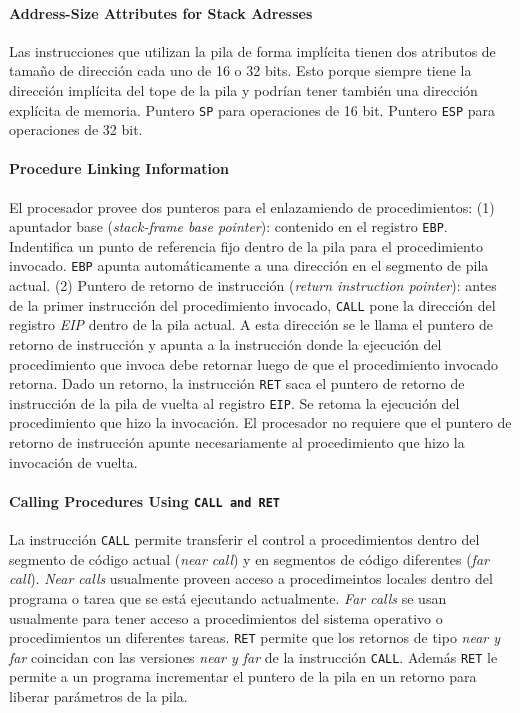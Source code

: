 \paragraph{Address-Size Attributes for Stack Adresses}
Las instrucciones que utilizan la pila de forma implícita tienen dos atributos de tamaño de dirección cada uno de 16 o 32 bits. Esto porque siempre tiene la dirección implícita del tope de la pila y podrían tener también una dirección explícita de memoria. Puntero \texttt{SP} para operaciones de 16 bit. Puntero \texttt{ESP} para operaciones de 32 bit. 

\paragraph{Procedure Linking Information}
El procesador provee dos punteros para el enlazamiendo de procedimientos: (1) apuntador base (\textit{stack-frame base pointer}): contenido en el registro \texttt{EBP}. Indentifica un punto de referencia fijo dentro de la pila para el procedimiento invocado. \texttt{EBP} apunta automáticamente a una dirección en el segmento de pila actual. (2) Puntero de retorno de instrucción (\textit{return instruction pointer}): antes de la primer instrucción del procedimiento invocado, \texttt{CALL} pone la dirección del registro \textit{EIP} dentro de la pila actual. A esta dirección se le llama el puntero de retorno de instrucción y apunta a la instrucción donde la ejecución del procedimiento que invoca debe retornar luego de que el procedimiento invocado retorna. Dado un retorno, la instrucción \texttt{RET} saca el puntero de retorno de instrucción de la pila de vuelta al registro \texttt{EIP}. Se retoma la ejecución del procedimiento que hizo la invocación. El procesador no requiere que el puntero de retorno de instrucción apunte necesariamente al procedimiento que hizo la invocación de vuelta.

\paragraph{\textnormal{\textbf{Calling Procedures Using \texttt{CALL \textnormal{\textbf{and}} RET}}}}
La instrucción \texttt{CALL} permite transferir el control a procedimientos dentro del segmento de código actual (\textit{near call}) y en segmentos de código diferentes (\textit{far call}). \textit{Near calls} usualmente proveen acceso a procedimeintos locales dentro del programa o tarea que se está ejecutando actualmente. \textit{Far calls} se usan usualmente para tener acceso a procedimientos del sistema operativo o procedimientos un diferentes tareas. \texttt{RET} permite que los retornos de tipo \textit{near \textnormal{y} far} coincidan con las versiones \textit{near \textnormal{y} far} de la instrucción \texttt{CALL}. Además \texttt{RET} le permite a un programa incrementar el puntero de la pila en un retorno para liberar parámetros de la pila. 

